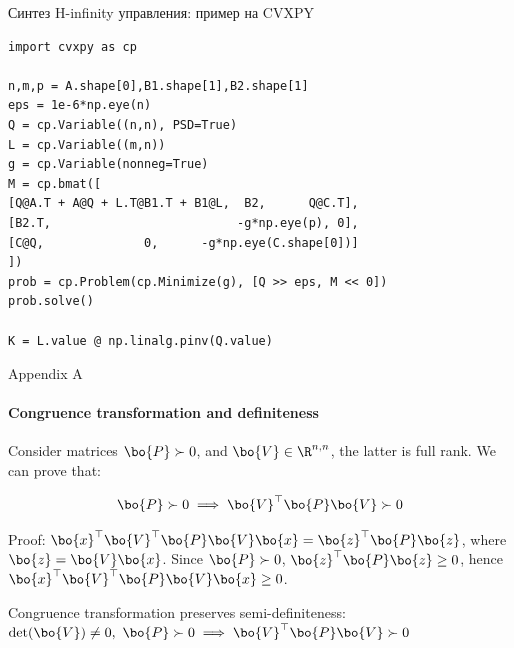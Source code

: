 \documentclass{beamer}
\begin{document}
	
\begin{frame}[fragile]{Синтез H-infinity управления: пример на CVXPY}
		\begin{flushleft}
			{\small
			\begin{verbatim}
import cvxpy as cp

n,m,p = A.shape[0],B1.shape[1],B2.shape[1]
eps = 1e-6*np.eye(n)
Q = cp.Variable((n,n), PSD=True)
L = cp.Variable((m,n))
g = cp.Variable(nonneg=True)
M = cp.bmat([
[Q@A.T + A@Q + L.T@B1.T + B1@L,  B2,      Q@C.T],
[B2.T,                          -g*np.eye(p), 0],
[C@Q,              0,      -g*np.eye(C.shape[0])]
])
prob = cp.Problem(cp.Minimize(g), [Q >> eps, M << 0])
prob.solve()

K = L.value @ np.linalg.pinv(Q.value)
			\end{verbatim}}
		\end{flushleft}
	\end{frame}
	
	
	
\myqrframe
	
	
	
	
	\begin{frame}{Appendix A}
		\framesubtitle{Congruence transformation and definiteness}
		\begin{flushleft}
			
			Consider matrices $\bo{P} \succ 0$, and $\bo{V} \in \R^{n, n}$, the latter is full rank. We can prove that:
			
			\begin{equation}
				\bo{P} \succ 0 \implies \bo{V}^\top\bo{P}\bo{V} \succ 0
			\end{equation}
			
			Proof: $\bo{x}^\top\bo{V}^\top\bo{P}\bo{V}\bo{x} = \bo{z}^\top\bo{P}\bo{z}$, where $\bo{z} = \bo{V}\bo{x}$. Since $\bo{P} \succ 0$, $\bo{z}^\top\bo{P}\bo{z} \geq 0$, hence $\bo{x}^\top\bo{V}^\top\bo{P}\bo{V}\bo{x} \geq 0$. 
			
			\begin{definition}
				Congruence transformation preserves semi-definiteness: $\text{det}(\bo{V}) \neq 0, \ \bo{P} \succ 0 \implies \bo{V}^\top\bo{P}\bo{V} \succ 0$
			\end{definition}
			
			
		\end{flushleft}
	\end{frame}
	
	
	
	
\end{document}
